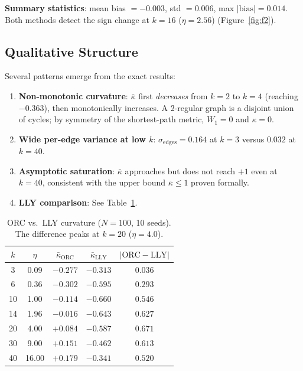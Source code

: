 \documentclass[12pt]{article}
\newcommand{\kbar}{\bar{\kappa}}
\begin{document}
\noindent\textbf{Summary statistics}: mean bias $= -0.003$, std $= 0.006$, max
$|\text{bias}| = 0.014$. Both methods detect the sign change at $k = 16$ ($\eta = 2.56$)
(Figure~\ref{fig:f2}).

\subsection{Qualitative Structure}

Several patterns emerge from the exact results:

\begin{enumerate}
  \item \textbf{Non-monotonic curvature}: $\kbar$ first \emph{decreases} from $k=2$ to
  $k=4$ (reaching $-0.363$), then monotonically increases. A 2-regular graph is a disjoint
  union of cycles; by symmetry of the shortest-path metric, $W_1 = 0$ and $\kappa = 0$.

  \item \textbf{Wide per-edge variance at low $k$}: $\sigma_{\mathrm{edges}} = 0.164$ at
  $k = 3$ versus $0.032$ at $k = 40$.

  \item \textbf{Asymptotic saturation}: $\kbar$ approaches but does not reach $+1$ even
  at $k = 40$, consistent with the upper bound $\kbar \leq 1$ proven formally.

  \item \textbf{LLY comparison}: See Table~\ref{tab:lly}.
\end{enumerate}

\begin{table}[ht]
\centering
\caption{ORC vs.\ LLY curvature ($N = 100$, 10 seeds). The difference peaks at
$k = 20$ ($\eta = 4.0$).}
\label{tab:lly}
\begin{tabular}{cc ccc}
\toprule
$k$ & $\eta$ & $\kbar_{\mathrm{ORC}}$ & $\kbar_{\mathrm{LLY}}$ & $|\mathrm{ORC} - \mathrm{LLY}|$ \\
\midrule
3  & 0.09  & $-0.277$ & $-0.313$ & $0.036$ \\
6  & 0.36  & $-0.302$ & $-0.595$ & $0.293$ \\
10 & 1.00  & $-0.114$ & $-0.660$ & $0.546$ \\
14 & 1.96  & $-0.016$ & $-0.643$ & $0.627$ \\
20 & 4.00  & $+0.084$ & $-0.587$ & $\bm{0.671}$ \\
30 & 9.00  & $+0.151$ & $-0.462$ & $0.613$ \\
40 & 16.00 & $+0.179$ & $-0.341$ & $0.520$ \\
\bottomrule
\end{tabular}
\end{table}
\end{document}
